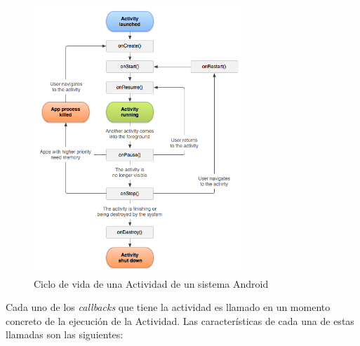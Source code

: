 \begin{figure}[h]

\centering
\includegraphics[width=0.7\textwidth]{./Imagenes/Bitmap/Ciclo_de_vida_Android}
\caption{Ciclo de vida de una Actividad de un sistema Android}
\label{ciclo}
\end{figure}


Cada uno de los \emph{callbacks} que tiene la actividad es llamado en un momento concreto de la ejecuci\'on de la Actividad. Las caracter\'isticas de cada una de estas llamadas son las siguientes:

